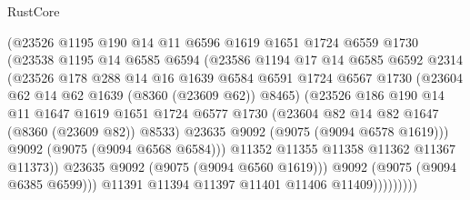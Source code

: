 \begin{lexlean}{RustCore}
\begin{coremodule}
                        (@23526
                          @1195
                          @190
                          @14
                          @11
                          @6596
                          @1619
                          @1651
                          @1724
                          @6559
                          @1730
                          (@23538
                            @1195
                            @14
                            @6585
                            @6594
                            (@23586
                              @1194
                              @17
                              @14
                              @6585
                              @6592
                              @2314
                              (@23526
                                @178
                                @288
                                @14
                                @16
                                @1639
                                @6584
                                @6591
                                @1724
                                @6567
                                @1730
                                (@23604 @62 @14 @62 @1639 (@8360 (@23609 @62)) @8465)
                                (@23526
                                  @186
                                  @190
                                  @14
                                  @11
                                  @1647
                                  @1619
                                  @1651
                                  @1724
                                  @6577
                                  @1730
                                  (@23604 @82 @14 @82 @1647 (@8360 (@23609 @82)) @8533)
                                  @23635
                                  @9092
                                  (@9075 (@9094 @6578 @1619)))
                                @9092
                                (@9075 (@9094 @6568 @6584)))
                              @11352
                              @11355
                              @11358
                              @11362
                              @11367
                              @11373))
                          @23635
                          @9092
                          (@9075 (@9094 @6560 @1619)))
                        @9092
                        (@9075 (@9094 @6385 @6599)))
                      @11391
                      @11394
                      @11397
                      @11401
                      @11406
                      @11409)))))))))

\end{coremodule}
\end{lexlean}
